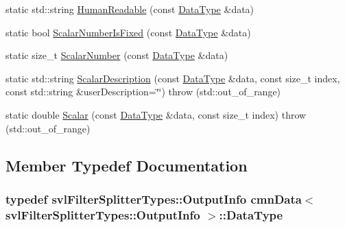 \begin{DoxyCompactItemize}
\item 
static std\-::string \hyperlink{classcmn_data_3_01svl_filter_splitter_types_1_1_output_info_01_4_ac9f11860ac65609530257506162e1572}{Human\-Readable} (const \hyperlink{classcmn_data_3_01svl_filter_splitter_types_1_1_output_info_01_4_ad3099e3eeadaec326e214501ba10a222}{Data\-Type} \&data)
\item 
static bool \hyperlink{classcmn_data_3_01svl_filter_splitter_types_1_1_output_info_01_4_a68f7a67494f1bbcc8dd67aa92240c329}{Scalar\-Number\-Is\-Fixed} (const \hyperlink{classcmn_data_3_01svl_filter_splitter_types_1_1_output_info_01_4_ad3099e3eeadaec326e214501ba10a222}{Data\-Type} \&data)
\item 
static size\-\_\-t \hyperlink{classcmn_data_3_01svl_filter_splitter_types_1_1_output_info_01_4_a65d65b876b34ec9a4222784ef5612d2b}{Scalar\-Number} (const \hyperlink{classcmn_data_3_01svl_filter_splitter_types_1_1_output_info_01_4_ad3099e3eeadaec326e214501ba10a222}{Data\-Type} \&data)
\item 
static std\-::string \hyperlink{classcmn_data_3_01svl_filter_splitter_types_1_1_output_info_01_4_ab77ab55423500044aa70be80ff4002d2}{Scalar\-Description} (const \hyperlink{classcmn_data_3_01svl_filter_splitter_types_1_1_output_info_01_4_ad3099e3eeadaec326e214501ba10a222}{Data\-Type} \&data, const size\-\_\-t index, const std\-::string \&user\-Description=\char`\"{}\char`\"{})  throw (std\-::out\-\_\-of\-\_\-range)
\item 
static double \hyperlink{classcmn_data_3_01svl_filter_splitter_types_1_1_output_info_01_4_a0706b3241bd9ed094af5a5f90a34e84f}{Scalar} (const \hyperlink{classcmn_data_3_01svl_filter_splitter_types_1_1_output_info_01_4_ad3099e3eeadaec326e214501ba10a222}{Data\-Type} \&data, const size\-\_\-t index)  throw (std\-::out\-\_\-of\-\_\-range)
\end{DoxyCompactItemize}


\subsection{Member Typedef Documentation}
\hypertarget{classcmn_data_3_01svl_filter_splitter_types_1_1_output_info_01_4_ad3099e3eeadaec326e214501ba10a222}{
\subsubsection[{Data\-Type}]{\setlength{\rightskip}{0pt plus 5cm}typedef {\bf svl\-Filter\-Splitter\-Types\-::\-Output\-Info} {\bf cmn\-Data}$<$ {\bf svl\-Filter\-Splitter\-Types\-::\-Output\-Info} $>$\-::{\bf Data\-Type}}}\label{classcmn_data_3_01svl_filter_splitter_types_1_1_output_info_01_4_ad3099e3eeadaec326e214501ba10a222}


